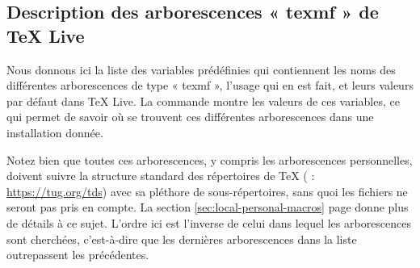 \documentclass[german, english, french]{article}
\renewcommand{\TL}{\TeX{} Live\xspace}%
\begin{document}
\subsection{Description des arborescences « texmf » de \protect\TL}
\label{sec:texmftrees}

Nous donnons ici la liste des variables prédéfinies qui contiennent les noms des
différentes arborescences de type « texmf », l'usage qui en est fait, et leurs
valeurs par défaut dans \TL. La commande  montre les valeurs
de ces variables, ce qui permet de savoir où se trouvent ces différentes
arborescences dans une installation donnée.

Notez bien que toutes ces arborescences, y compris les arborescences
personnelles, doivent suivre la structure standard des répertoires de \TeX{}
(\TDS{} : \url{https://tug.org/tds}) avec sa pléthore de sous-répertoires, sans
quoi les fichiers ne seront pas pris en compte. La section
\ref{sec:local-personal-macros} page \pageref{sec:local-personal-macros} donne
plus de détails à ce sujet. L'ordre ici est l'inverse de celui dans lequel les
arborescences sont cherchées, c'est-à-dire que les dernières arborescences dans
la liste outrepassent les précédentes.
\end{document}
